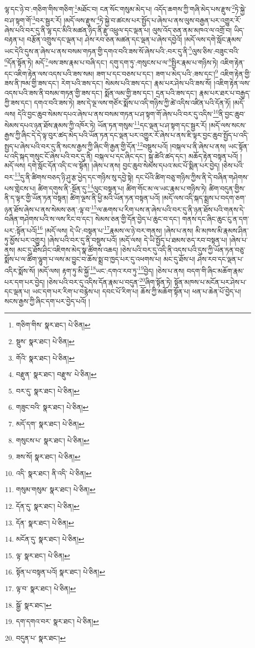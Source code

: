 ལྷ་དང་ཉེ་བ་:གཅིག་གིས་གཅིག་\footnote{གཅིག་གིས་  སྣར་ཐང་།  པེ་ཅིན། }མཐོང་བ། ངན་སོང་གསུམ་མེད་པ། འདོད་ཆགས་ཀྱི་གཞི་མེད་པས་རྫུས་\footnote{སྡུས་  སྣར་ཐང་།  པེ་ཅིན། }ཏེ་སྐྱེ་བ་ཤ་སྟག་གོ་\footnote{གོའི་  སྣར་ཐང་།  པེ་ཅིན། }བར་སྦྱར་རོ། །མདོ་ལས་རྫུས་\footnote{བརྫུན་  སྣར་ཐང་། བརྫུས་  པེ་ཅིན། }ཏེ་སྐྱེ་བ་ཚངས་པར་སྤྱོད་པ་ཞེས་པ་ནས་ལུས་བརྒྱན་པར་འགྱུར་རོ་ཞེས་པའི་བར་དུ་ནི་ལྷ་དང་མིའི་མཚན་ཉིད་ནི་རྫུ་འཕྲུལ་དང་ལྡན་པ། ལུས་འོད་ཅན་ནམ་མཁའ་ལ་འགྲོ་བ། ཡིད་བརྟན་པ། བརྩོན་འགྲུས་དང་ལྡན་པ། ཤེས་རབ་ཅན་མཚན་དང་ལྡན་པ་ཞེས་དབྱེའོ། །མདོ་ལས་དགེ་སློང་རྣམས་ཡང་དེའི་དུས་ན་ཞེས་པ་ནས་བསམ་གཏན་གྱི་དགའ་བའི་ཟས་སོ་ཞེས་པའི་:བར་དུ་ནི་\footnote{བར་དུ་  སྣར་ཐང་།  པེ་ཅིན། }ལུས་ཅིས་:བཟུང་བའི་\footnote{གཟུང་བའི་  སྣར་ཐང་།  པེ་ཅིན། }དོན་སྟོན་ཏེ། མདོ་\footnote{མདོ་དག་  སྣར་ཐང་།  པེ་ཅིན། }ལས་ཟས་རྣམ་པ་བཞི་དང་། དགུ་དག་ཏུ་:གསུངས་པ་ལ་\footnote{གསུངས་པ་  སྣར་ཐང་།  པེ་ཅིན། }སྤྱིར་རྣམ་པ་གཉིས་ཏེ། འཇིག་རྟེན་དང་འཇིག་རྟེན་ལས་འདས་པའི་ཟས་སམ། ཟག་པ་དང་བཅས་པ་དང་། ཟག་པ་མེད་པའི་:ཟས་དང་།\footnote{ཟས་སོ།  སྣར་ཐང་།  པེ་ཅིན། } འཇིག་རྟེན་གྱི་ཟས་ནི་ཁམ་གྱི་ཟས་དང་། རེག་པའི་ཟས་དང་། སེམས་པའི་ཟས་དང་། རྣམ་པར་ཤེས་པའི་ཟས་སོ། །འཇིག་རྟེན་ལས་འདས་པའི་ཟས་ནི་བསམ་གཏན་གྱི་ཟས་དང་། སྨོན་ལམ་གྱི་ཟས་དང་། དྲན་པའི་ཟས་དང་། རྣམ་པར་ཐར་པ་བརྒྱད་ཀྱི་ཟས་དང་། དགའ་བའི་ཟས་ཏེ། ཟས་དེ་ལྔ་ལས་གཙོར་སྨོས་པ་འདི་གཉིས་ཀྱི་ཚེ་འདིས་འཛིན་པའི་དོན་ཏོ། །མདོ་ལས། དེའི་བྱང་ཆུབ་སེམས་དཔའ་ཞེས་པ་ནས་བསམ་གཏན་པ་ཤ་སྟག་གོ་ཞེས་པའི་བར་དུ་འདིས་\footnote{འདི་  སྣར་ཐང་། ནི་འདི་  པེ་ཅིན། }ནི་བྱང་ཆུབ་སེམས་དཔའ་ཉན་ཐོས་རྣམས་ཀྱི་འཁོར་ཏེ། ཡོན་ཏན་གསུམ་\footnote{གསུམ་གསུམ་  སྣར་ཐང་།  པེ་ཅིན། }དང་ལྡན་པ་ཤ་སྟག་དང་སྦྱར་རོ། །མདོ་ལས་སངས་རྒྱས་ཀྱི་ཞིང་དེ་དེ་ལྟ་བུར་ཚད་མེད་པའི་ཡོན་ཏན་དང་ལྡན་པར་འགྱུར་རོ་ཞེས་པ་ནས་ཇི་ལྟར་བྱང་ཆུབ་སྤྱོད་པ་འདི་སྤྱད་པ་ཞེས་པའི་བར་དུ་ནི་སངས་རྒྱས་ཀྱི་ཞིང་གི་རྒྱན་གྱི་དོན་\footnote{དོན་དུ་  སྣར་ཐང་།  པེ་ཅིན། }བསྡུས་པའོ། །བསྐལ་པ་ནི་ཞེས་པ་ནས། ཡང་སྟོན་པ་འདི་སྐད་གསུང་ངོ་ཞེས་པའི་བར་དུ་ནི། བསྐལ་པ་དང་ཞིང་དང་། སྐུ་ཚེའི་ཚད་དང་། མཆོད་རྟེན་བསྟན་པའོ། །མདོ་ལས། དགེ་སློང་དོན་འདི་ང་ལ་སྟོན། །ཞེས་པ་ནས། བྱང་ཆུབ་སེམས་དཔའ་མང་པོ་སྨིན་པར་བྱེད། །ཅེས་པའི་བར་\footnote{དོན་  སྣར་ཐང་།  པེ་ཅིན། }དུ་ནི་ཚིགས་བཅད་ཉི་ཤུ་རྩ་ཕྱེད་དང་གཉིས་སུ་དབྱེ་སྟེ། དང་པོའི་ཚིག་བཅུ་གཉིས་ཀྱིས་ནི་དེ་བཞིན་གཤེགས་པས་གླེངས་པ། ཚིག་དགུས་ནི་:སྔོན་དུ་\footnote{མངོན་དུ་  སྣར་ཐང་།  པེ་ཅིན། }ལུང་བསྟན་པ། ཚིག་གོང་མ་ལ་ཡང་རྣམ་པ་གཉིས་ཏེ། ཚིག་བདུན་གྱིས་ནི་ད་ལྟར་གྱི་ཡོན་ཏན་བསྟན། ཚིག་ལྔས་ནི་ཕྱི་མའི་ཡོན་ཏན་བསྟན་པའོ། །མདོ་ལས་འདི་སྐད་སྨྲས་པ་བདག་ཅག་ཉན་ཐོས་ཞེས་པ་ནས་སེམས་ཅན་:ལྟ་བ་\footnote{ལྟ་  སྣར་ཐང་།  པེ་ཅིན། }ལ་ཆགས་པ་རིག་པས་ན་ཞེས་པའི་བར་དུ་ནི་ཉན་ཐོས་པའི་གནས་དེ་བཞིན་གཤེགས་པའི་ས་ལས་རིང་བ་དང་། སེམས་ཅན་གྱི་དོན་བྱེད་པ་ཆུང་བ་དང་། གནས་དང་ཞིང་ཆུང་ངུ་ན་དག་པར་:སྟོན་པའོ།\footnote{སྟོན་པ་བསྟན་པའོ།  སྣར་ཐང་།  པེ་ཅིན། } །མདོ་ལས། དེ་ཡི་:བསྟན་པ་\footnote{ལྟ་བ་  སྣར་ཐང་།  པེ་ཅིན། }རྣམས་ལ་ཉེ་བར་གནས། །ཞེས་པ་ནས། མི་མཁས་མི་རྣམས་ཤིན་ཏུ་མྱོས་པར་འགྱུར། །ཞེས་པའི་བར་དུ་ནི་བསྡུས་པའོ། །མདོ་ལས། དེ་ཡི་སྤྱོད་པ་ཐམས་ཅད་རབ་བསྟན་པ། །ཞེས་པ་ནས། མང་དུ་ཐོས་ཤིང་འཇིགས་མེད་སྣ་ཚོགས་འཆད། །ཅེས་པའི་བར་དུ་འདི་ནི་འདས་པའི་དུས་ཀྱི་ཡོན་ཏན་བཅུ་སྨོས་པ་ལ་ཚིག་ལྷུག་པ་ལས་མ་བྱུང་བ་ཆོས་སྨྲ་བ་ཁྱད་པར་དུ་འཕགས་པ། མང་དུ་ཐོས་པ། ཤེས་རབ་དང་ལྡན་པ་འདིར་སྨོས་སོ། །མདོ་ལས། རྟག་ཏུ་མི་སྐྱོ་\footnote{སྒྱོ་  སྣར་ཐང་། }ཡང་:དགའ་རབ་ཏུ་\footnote{དག་དགའ་བར་  སྣར་ཐང་།  པེ་ཅིན། }བྱེད། །ཅེས་པ་ནས། བདག་གི་ཞིང་མཆོག་རྣམ་པར་དག་པར་བྱེད། །ཅེས་པའི་བར་དུ་འདིས་དོན་རྣམ་པ་བདུན་\footnote{བདུན་པ་  སྣར་ཐང་། }ཞིག་སྟོན་ཏེ། སྟོན་མཁས་པ་མངོན་པར་ཤེས་པ་དང་ལྡན་པ། ཡང་དག་པར་རིག་པ་བརྙེས་པ། དབང་པོ་རིག་པ། ཆོས་ཀྱི་མཆོག་སྟོན་པ། ཕན་པ་ཆེན་པོ་བྱེད་པ། སངས་རྒྱས་ཀྱི་ཞིང་དག་པར་བྱེད་པའོ། །
